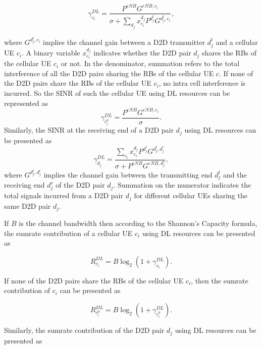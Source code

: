 \documentclass[times]{dacauth}
\begin{document}
 \begin{equation}\label{eqn:sinr_c}
	\gamma_{c_i}^{DL} = \frac{P^{eNB}G^{eNB,c_i}}{\sigma + \sum_{d_j} x_{c_i}^{d_j}P^{d_j^t}G^{d_j^t,c_i}},
 \end{equation}
 
\smallskip
\noindent
where $G^{d_j^t,c_i}$ implies the channel gain between a D2D transmitter $d_j^t$ and a cellular UE $c_i$. A binary variable $x_{c_i}^{d_j}$ indicates whether the D2D pair $d_j$  shares the RBs of the cellular UE $c_i$ or not. In the denominator, summation refers to the total interference of all the D2D pairs sharing the RBs of the cellular UE $c$.   
If none of the D2D pairs share the RBs of the cellular UE $c_i$, no intra cell interference is incurred. So the SINR of such the cellular UE using DL resources can be represented as
 \begin{equation}\label{eqn:sinr_c0}
 \gamma_{c_i^0}^{DL} = \frac{P^{eNB}G^{eNB,c_i}}{\sigma}.
 \end{equation}
\noindent 
Similarly, the SINR at the receiving end of a D2D pair $d_j$ using DL resources \cite{zulhasnine} can be presented as
\begin{equation}\label{eqn:sinr_d}
 \gamma_{d_j}^{DL} = \frac{\sum_{c_i} x_{c_i}^{d_j}P^{d_j^t}G^{{d_j^t},d_j^r}}{\sigma + P^{ eNB}G^{ eNB,d_j^r}},
\end{equation}
where $G^{d_j^t,d_j^r}$ implies the channel gain between the transmitting end $d_j^t$ and the receiving end $d_j^r$ of the D2D pair $d_j$. Summation on the numerator indicates the total signals incurred from a D2D pair $d_j$ for different cellular UEs sharing the same D2D pair $d_j$.

\smallskip
\noindent
If $B$ is the channel bandwidth then according to the Shannon's Capacity formula, the sumrate contribution of a cellular UE $c_i$ using DL resources can be presented as

\begin{equation}\label{eqn:sumrate_c}
	R_{c_i}^{DL} = B\log_{2}(1+\gamma_{c_i}^{DL}).
\end{equation}

\noindent
If none of the D2D pairs share the RBs of the cellular UE $c_i$, then the sumrate contribution of $c_i$ can be presented as

\begin{equation}\label{eqn:sumrate_c0}
	R_{c_i^0}^{DL} = B\log_{2}(1+\gamma_{c_i^0}^{DL}).
\end{equation}


\noindent
Similarly, the sumrate contribution of the D2D pair $d_j$ using DL resources can be presented as
\end{document}

